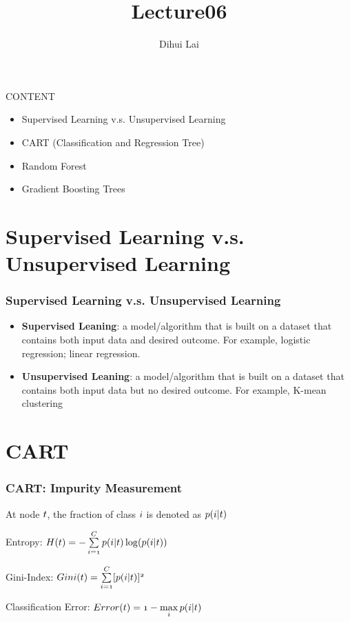 \documentclass[notheorems, aspectratio=54]{beamer}
\title{Lecture06}
\author{Dihui Lai}
\institute[WUSTL]{dlai@wustl.edu}
\begin{document}
\begin{frame}
    \titlepage
\end{frame}


\begin{frame}
CONTENT
\begin{itemize}
\item Supervised Learning v.s. Unsupervised Learning
\item CART (Classification and Regression Tree)
\item Random Forest
\item Gradient Boosting Trees
\end{itemize} 
\end{frame}


\section{Supervised Learning v.s. Unsupervised Learning}

\begin{frame}
\frametitle{Supervised Learning v.s. Unsupervised Learning}
\begin{itemize}
\item \textbf{Supervised Leaning}: a model/algorithm that is built on a dataset that contains both input data and desired outcome. For example, logistic regression; linear regression.
\item \textbf{Unsupervised Leaning}: a model/algorithm that is built on a dataset that contains both input data but no desired outcome. For example, K-mean clustering
\end{itemize}
\end{frame}

\section{CART}
\begin{frame}
    \frametitle{CART: Impurity Measurement}
    At node $\mathnormal{t}$, the fraction of class $\mathnormal{i}$ is denoted as $\mathnormal{p(i|t)}$
    
    Entropy: $\mathnormal{H(t)=-\sum\limits_{i=1}^{C}p(i|t)\log(p(i|t))}$
    
    Gini-Index: $\mathnormal{Gini(t)=\sum\limits_{i=1}^{C}[p(i|t)]^2}$
    
    Classification Error: $\mathnormal{Error(t)=1-\max\limits_{i}p(i| t)}$
\end{frame}
\end{document}
